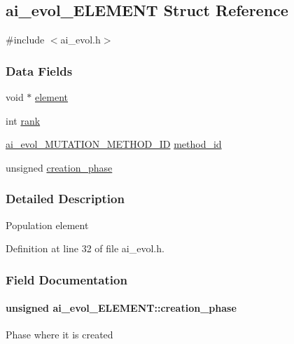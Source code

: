 \hypertarget{a00001}{\subsection{ai\-\_\-evol\-\_\-\-E\-L\-E\-M\-E\-N\-T Struct Reference}
\label{a00001}
}


{\ttfamily \#include $<$ai\-\_\-evol.\-h$>$}

\subsubsection*{Data Fields}
\begin{DoxyCompactItemize}
\item 
void $\ast$ \hyperlink{a00001_a35a0ba554bf0676ec76c481e1468d835}{element}
\item 
int \hyperlink{a00001_a0ccdc51cab1f06849e6518518f1888e5}{rank}
\item 
\hyperlink{a00008_a718dd70dd5597e1668aeeb7cd49fed03}{ai\-\_\-evol\-\_\-\-M\-U\-T\-A\-T\-I\-O\-N\-\_\-\-M\-E\-T\-H\-O\-D\-\_\-\-I\-D} \hyperlink{a00001_a5c392b9ad7400ff3f96c1b6105a82fce}{method\-\_\-id}
\item 
unsigned \hyperlink{a00001_a10b5e6a4ed8bd4aea40732c57e3199dc}{creation\-\_\-phase}
\end{DoxyCompactItemize}


\subsubsection{Detailed Description}
Population element 

Definition at line 32 of file ai\-\_\-evol.\-h.



\subsubsection{Field Documentation}
\hypertarget{a00001_a10b5e6a4ed8bd4aea40732c57e3199dc}{
\paragraph[{creation\-\_\-phase}]{\setlength{\rightskip}{0pt plus 5cm}unsigned ai\-\_\-evol\-\_\-\-E\-L\-E\-M\-E\-N\-T\-::creation\-\_\-phase}}\label{a00001_a10b5e6a4ed8bd4aea40732c57e3199dc}
Phase where it is created 

